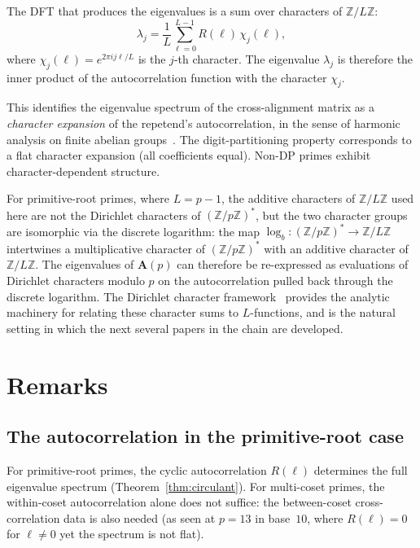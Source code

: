 \documentclass[12pt]{amsart}
\theoremstyle{definition}
\theoremstyle{remark}
\begin{document}
The DFT that produces the eigenvalues is a sum over characters
of $\mathbb{Z}/L\mathbb{Z}$:
\[
\lambda_j = \frac{1}{L} \sum_{\ell=0}^{L-1}
R(\ell)\, \chi_j(\ell),
\]
where $\chi_j(\ell) = e^{2\pi i j\ell/L}$ is the $j$-th character.
The eigenvalue $\lambda_j$ is therefore the inner product of the
autocorrelation function with the character $\chi_j$.

This identifies the eigenvalue spectrum of the cross-alignment
matrix as a \emph{character expansion} of the repetend's
autocorrelation, in the sense of harmonic analysis on finite
abelian groups~\cite{terras}. The digit-partitioning property corresponds to a
flat character expansion (all coefficients equal). Non-DP primes
exhibit character-dependent structure.

For primitive-root primes, where $L = p - 1$, the additive
characters of $\mathbb{Z}/L\mathbb{Z}$ used here are not the
Dirichlet characters of $(\mathbb{Z}/p\mathbb{Z})^*$, but the
two character groups are isomorphic via the discrete logarithm:
the map $\log_b : (\mathbb{Z}/p\mathbb{Z})^* \to \mathbb{Z}/L\mathbb{Z}$
intertwines a multiplicative character of
$(\mathbb{Z}/p\mathbb{Z})^*$ with an additive character of
$\mathbb{Z}/L\mathbb{Z}$. The eigenvalues of $\mathbf{A}(p)$ can
therefore be re-expressed as evaluations of Dirichlet characters
modulo $p$ on the autocorrelation pulled back through the
discrete logarithm. The Dirichlet character framework~\cite{iwaniec}
provides the analytic machinery for relating these character sums
to $L$-functions, and is the natural setting in which the next
several papers in the chain are developed.

\section{Remarks}

\subsection*{The autocorrelation in the primitive-root case}

For primitive-root primes, the cyclic autocorrelation
$R(\ell)$ determines the full eigenvalue spectrum
(Theorem~\ref{thm:circulant}). For multi-coset primes,
the within-coset autocorrelation alone does not suffice:
the between-coset cross-correlation data is also needed
(as seen at $p = 13$ in base~$10$, where $R(\ell) = 0$
for $\ell \ne 0$ yet the spectrum is not flat).
\end{document}
